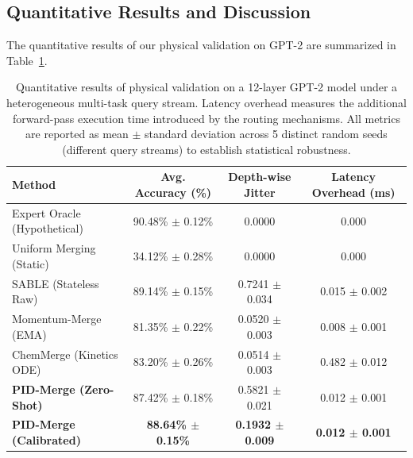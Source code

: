 \subsection{Quantitative Results and Discussion}
The quantitative results of our physical validation on GPT-2 are summarized in Table~\ref{tab:gpt2_results}.

\begin{table}[h]
\caption{Quantitative results of physical validation on a 12-layer GPT-2 model under a heterogeneous multi-task query stream. Latency overhead measures the additional forward-pass execution time introduced by the routing mechanisms. All metrics are reported as mean $\pm$ standard deviation across 5 distinct random seeds (different query streams) to establish statistical robustness.}
\label{tab:gpt2_results}
\vskip 0.15in
\begin{center}
\begin{small}
\begin{sc}
\begin{tabular}{lccc}
\toprule
Method & Avg. Accuracy (\%) & Depth-wise Jitter & Latency Overhead (ms) \\
\midrule
Expert Oracle (Hypothetical) & 90.48\% $\pm$ 0.12\% & 0.0000 & 0.000 \\
Uniform Merging (Static)    & 34.12\% $\pm$ 0.28\% & 0.0000 & 0.000 \\
SABLE (Stateless Raw)       & 89.14\% $\pm$ 0.15\% & 0.7241 $\pm$ 0.034 & 0.015 $\pm$ 0.002 \\
Momentum-Merge (EMA)        & 81.35\% $\pm$ 0.22\% & 0.0520 $\pm$ 0.003 & 0.008 $\pm$ 0.001 \\
ChemMerge (Kinetics ODE)    & 83.20\% $\pm$ 0.26\% & 0.0514 $\pm$ 0.003 & 0.482 $\pm$ 0.012 \\
\midrule
\textbf{PID-Merge (Zero-Shot)} & 87.42\% $\pm$ 0.18\% & 0.5821 $\pm$ 0.021 & 0.012 $\pm$ 0.001 \\
\textbf{PID-Merge (Calibrated)} & \textbf{88.64\% $\pm$ 0.15\%} & \textbf{0.1932 $\pm$ 0.009} & \textbf{0.012 $\pm$ 0.001} \\
\bottomrule
\end{tabular}
\end{sc}
\end{small}
\end{center}
\vskip -0.1in
\end{table}


